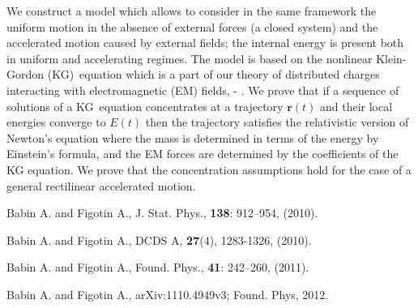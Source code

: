 \documentclass[10pt,a4paper]{article}
\begin{document}
We construct a model which allows to consider in the same framework the
uniform motion in the absence of external forces (a closed system) and the
accelerated motion caused by external fields; the internal energy is present
both in uniform and accelerating regimes. The model is based on the
nonlinear Klein-Gordon (KG)\ equation which is a part of our theory of
distributed charges interacting with electromagnetic (EM) fields, \cite{BF5}-%
\cite{BF8}. We prove that if a sequence of solutions of a KG\ equation
concentrates at a trajectory $\mathbf{r}(t)$ and their local energies
converge to $E(t)$ then the trajectory satisfies the relativistic version of
Newton's equation where the mass is determined in terms of the energy by
Einstein's formula, and the EM forces are determined by the coefficients of
the KG equation. We prove that the concentration assumptions hold for the
case of a general rectilinear accelerated motion.
\ \vskip -0.6cm\ 

\begin{thebibliography}{9}
 Babin A. and Figotin A., J. Stat. Phys., \textbf{138}:
912--954, (2010).

 Babin A. and Figotin A., DCDS A, \textbf{27}(4), 1283-1326,
(2010).

 Babin A. and Figotin A., Found. Phys., \textbf{41}: 242--260,
(2011).

 Babin A. and Figotin A., arXiv:1110.4949v3; Found. Phys, 2012.
\end{thebibliography}
\end{document}
